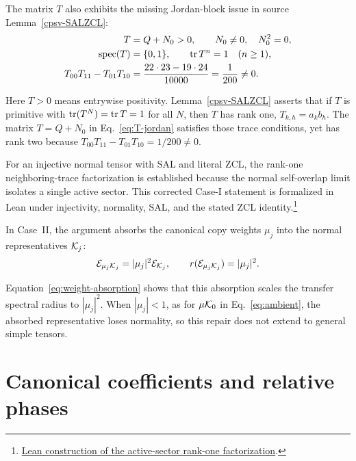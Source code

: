 \documentclass[aps,pra,reprint,nofootinbib,onecolumn]{revtex4-2}
\begin{document}
The matrix $T$ also exhibits the missing Jordan-block issue in
source Lemma~\ref{cpsv-SALZCL}:
\begin{align}
	T                      & =Q+N_0>0,\qquad N_0\ne0,\quad N_0^2=0,\nonumber     \\
	\operatorname{spec}(T) & =\{0,1\},\qquad \operatorname{tr} T^n=1\quad(n\geq1),\nonumber    \\
	T_{00}T_{11}-T_{01}T_{10}
	                       & =\frac{22\cdot23-19\cdot24}{10000}=\frac1{200}\ne0.
	\label{eq:T-jordan}
\end{align}
\begin{refutation}
	Here $T>0$ means entrywise positivity. Lemma~\ref{cpsv-SALZCL} asserts
	that if $T$ is primitive with $\operatorname{tr}(T^N)=\operatorname{tr} T=1$ for all $N$, then $T$ has
	rank one, $T_{k,h}=a_kb_h$. The matrix $T=Q+N_0$ in Eq.~\eqref{eq:T-jordan}
	satisfies those trace conditions, yet has rank two because
	$T_{00}T_{11}-T_{01}T_{10}=1/200\ne0$.
\end{refutation} For an injective normal tensor with
SAL and literal ZCL, the rank-one neighboring-trace factorization is
established because the normal self-overlap limit isolates a single active
sector. This corrected Case-I statement is formalized in Lean under
injectivity, normality, SAL, and the stated ZCL identity.\footnote{\href{https://sirui-lu.com/TNLean/docs/TNLean/MPS/MPDO/InverseMapLemmaC5CaseI.html\#MPOTensor.exists_activeSectorTraceMatrix_rank_one_coefficients_of_isSAL_of_literal_ZCL}{Lean construction of the active-sector rank-one factorization}.}

In Case~II, the argument absorbs the canonical copy weights $\mu_j$ into the
normal representatives $\mathcal{K}_j$:
\begin{align}
	\mathcal{E}_{\mu_j\mathcal{K}_j}=|\mu_j|^2\mathcal{E}_{\mathcal{K}_j},
	\qquad
	r(\mathcal{E}_{\mu_j\mathcal{K}_j})=|\mu_j|^2.
	\label{eq:weight-absorption}
\end{align}
\begin{refutation}
	Equation~\eqref{eq:weight-absorption} shows that this absorption scales the
	transfer spectral radius to $|\mu_j|^2$. When $|\mu_j|<1$, as for $\mu\mathcal{K}_0$
	in Eq.~\eqref{eq:ambient}, the absorbed representative loses normality, so this
	repair does not extend to general simple tensors.
\end{refutation}

\section{Canonical coefficients and relative phases}\label{sec:weights-phases}
\end{document}
